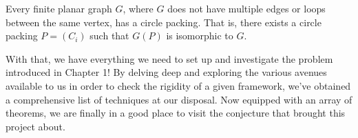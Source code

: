 \begin{theorem}
\label{thm: circle packing theorem}
Every finite planar graph $G$, where $G$ does not have multiple edges or loops between the same vertex, has a circle packing. That is, there exists a circle packing $P = (C_i)$ such that $G(P)$ is isomorphic to $G$.
\end{theorem}

\begin{flushleft}
With that, we have everything we need to set up and investigate the problem introduced in Chapter 1! By delving deep and exploring the various avenues available to us in order to check the rigidity of a given framework, we've obtained a comprehensive list of techniques at our disposal. Now equipped with an array of theorems, we are finally in a good place to visit the conjecture that brought this project about. 
\end{flushleft}

